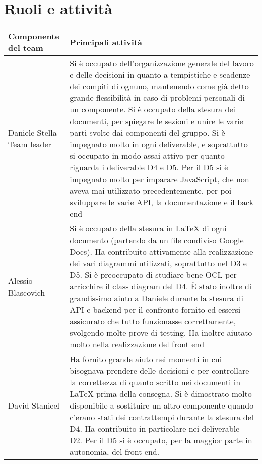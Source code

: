 \documentclass{article}
\begin{document}
   \section{Ruoli e attività}
   \begin{tabular}{ |p{3cm}|p{15 cm}| } 
      \hline
      Componente del team & Principali attività \\
      \hline 
      Daniele Stella Team leader & Si è occupato dell’organizzazione generale del lavoro e delle decisioni in quanto a tempistiche e scadenze dei compiti di ognuno, mantenendo come già detto grande flessibilità in caso di problemi personali di un componente. Si è occupato della stesura dei documenti, per spiegare le sezioni e unire le varie parti svolte dai componenti del gruppo. Si è impegnato molto in ogni deliverable, e soprattutto si occupato in modo assai attivo per quanto riguarda i deliverable D4 e D5. Per il D5 si è impegnato molto per imparare JavaScript, che non aveva mai utilizzato precedentemente, per poi sviluppare le varie API, la documentazione e il back end \\
      \hline 
      Alessio Blascovich & Si è occupato della stesura in LaTeX di ogni documento (partendo da un file condiviso Google Docs). Ha contribuito attivamente alla realizzazione dei vari diagrammi utilizzati, soprattutto nel D3 e D5. Si è preoccupato di studiare bene OCL per arricchire il class diagram del D4. È stato inoltre di grandissimo aiuto a Daniele durante la stesura di API e backend per il confronto fornito ed essersi assicurato che tutto funzionasse correttamente, svolgendo molte prove di testing. Ha inoltre aiutato molto nella realizzazione del front end \\ 
      \hline
      David Stanicel & Ha fornito grande aiuto nei momenti in cui bisognava prendere delle decisioni e per controllare la correttezza di quanto scritto nei documenti in LaTeX prima della consegna. Si è dimostrato molto disponibile a sostituire un altro componente quando c’erano stati dei contrattempi durante la stesura del D4. Ha contribuito in particolare nei deliverable D2. Per il D5 si è occupato, per la maggior parte in autonomia, del front end.\\
      \hline
   \end{tabular}
\end{document}
